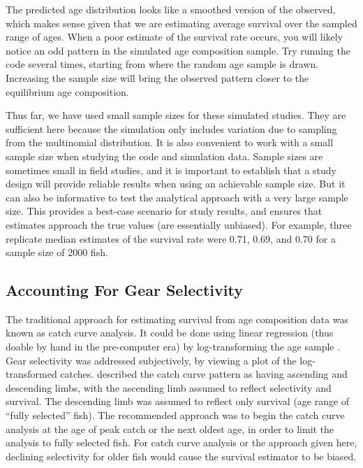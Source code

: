\documentclass[
]{krantz}
\begin{document}
The predicted age distribution looks like a smoothed version of the observed, which makes sense given that we are estimating average survival over the sampled range of ages. When a poor estimate of the survival rate occurs, you will likely notice an odd pattern in the simulated age composition sample. Try running the code several times, starting from where the random age sample is drawn. Increasing the sample size will bring the observed pattern closer to the equilibrium age composition.

Thus far, we have used small sample sizes for these simulated studies. They are sufficient here because the simulation only includes variation due to sampling from the multinomial distribution. It is also convenient to work with a small sample size when studying the code and simulation data. Sample sizes are sometimes small in field studies, and it is important to establish that a study design will provide reliable results when using an achievable sample size. But it can also be informative to test the analytical approach with a very large sample size. This provides a best-case scenario for study results, and ensures that estimates approach the true values (are essentially unbiased). For example, three replicate median estimates of the survival rate were 0.71, 0.69, and 0.70 for a sample size of 2000 fish.

\hypertarget{CC_Selectivity}{%
\subsection{Accounting For Gear Selectivity}\label{CC_Selectivity}}

The traditional approach for estimating survival from age composition data was known as catch curve analysis. It could be done using linear regression (thus doable by hand in the pre-computer era) by log-transforming the age sample \citep{ricker1975}. Gear selectivity was addressed subjectively, by viewing a plot of the log-transformed catches. \citet{ricker1975} described the catch curve pattern as having ascending and descending limbs, with the ascending limb assumed to reflect selectivity and survival. The descending limb was assumed to reflect only survival (age range of ``fully selected'' fish). The recommended approach was to begin the catch curve analysis at the age of peak catch or the next oldest age, in order to limit the analysis to fully selected fish. For catch curve analysis or the approach given here, declining selectivity for older fish would cause the survival estimator to be biased.
\end{document}
